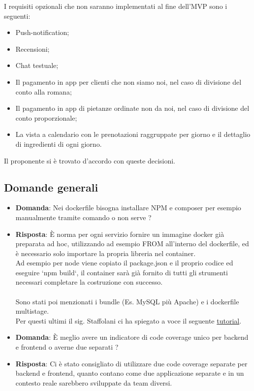 \documentclass[a4paper, 11pt]{article}
\begin{document}
I requisiti opzionali che non saranno implementati al fine dell'MVP sono i seguenti:

\begin{itemize}
\item Push-notification;
\item Recensioni;
\item Chat testuale;
\item Il pagamento in app per clienti che non siamo noi, nel caso di divisione del conto alla romana;
\item Il pagamento in app di pietanze ordinate non da noi, nel caso di divisione del conto proporzionale;
\item La vista a calendario con le prenotazioni raggruppate per giorno e il dettaglio di ingredienti di ogni giorno.
\end{itemize}

Il proponente si è trovato d'accordo con queste decisioni.

\subsection{Domande generali}

\begin{itemize}
\item \textbf{Domanda}: Nei dockerfile bisogna installare NPM e composer per esempio manualmente tramite comando o non serve ?%
\item \textbf{Risposta}: È norma per ogni servizio fornire un immagine docker già preparata ad hoc, utilizzando ad esempio FROM all'interno del dockerfile, ed è necessario solo importare la propria libreria nel container. \\ Ad esempio per node viene copiato il package.json e il proprio codice ed eseguire `npm build`, il container sarà già fornito di tutti gli strumenti necessari completare la costruzione con successo. \\ \\ Sono stati poi menzionati i bundle (Es. MySQL più Apache) e i dockerfile multistage. \\ Per questi ultimi il sig. Staffolani ci ha spiegato a voce il seguente \href{https://medium.com/@mohamedbenkhemiswork576/how-to-dockerize-a-react-app-with-multi-stage-build-and-nginx-minimize-react-image-size-by-80-33a09ae20118}{tutorial}.
\end{itemize}

\begin{itemize}
\item \textbf{Domanda}: È meglio avere un indicatore di code coverage unico per backend e frontend o averne due separati ?%
\item \textbf{Risposta}: Ci è stato consigliato di utilizzare due code coverage separate per backend e frontend, quanto contano come due applicazione separate e in un contesto reale sarebbero sviluppate da team diversi.
\end{itemize}
\end{document}

